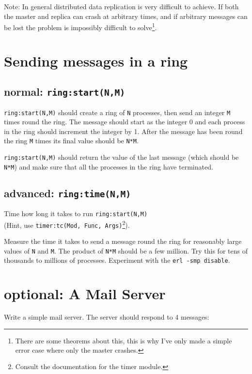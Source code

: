 \documentclass[12pt]{hitec}
\begin{document}
Note: In general distributed data replication is very difficult to
achieve.  If both the master and replica can crash at arbitrary times,
and if arbitrary messages can be lost the problem is impossibly
difficult to solve\footnote{There are some theorems about this, 
this is why I've only made a simple error case where only the master crashes.}.

\section{Sending messages in a ring}

\subsection{normal: \texttt{ring:start(N,M)}}

\verb+ring:start(N,M)+ should create a ring of \verb+N+ processes,
then send an integer \verb+M+ times round the ring. The message should
start as the integer 0 and each process in the ring should increment
the integer by 1.  After the message has been round the ring \verb+M+
times its final value should be \verb+N*M+. 

\verb+ring:start(N,M)+ should return the value of the last message
(which should be \verb+N*M+) and make sure that all the processes in
the ring have terminated.

\subsection{advanced: \texttt{ring:time(N,M)}}

Time how long it takes to run \verb+ring:start(N,M)+\\
(Hint, use
\verb+timer:tc(Mod, Func, Args)+\footnote{Consult the documentation for
  the timer module.}).

Measure the time it takes to send a message round the ring for
reasonably large values of \verb+N+ and \verb+M+. The product
of \verb+N*M+ should be a few million. Try this for tens of thousands to
millions of processes. Experiment with the \verb+erl -smp disable+.

\section{optional: A Mail Server}

Write a simple mail server. The server should respond to 4 messages:
\end{document}
